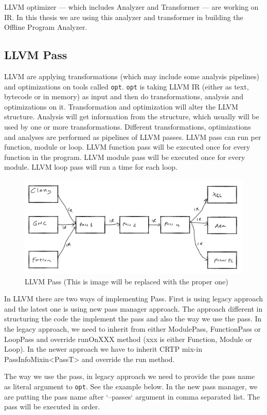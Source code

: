 LLVM optimizer — which includes Analyzer and Transformer — are working on IR. In this thesis we are using this analyzer and transformer in building the Offline Program Analyzer.

\subsection{LLVM Pass}

LLVM are applying transformations (which may include some analysis pipelines) and optimizations on tools called \texttt{opt}. \texttt{opt} is taking LLVM IR (either as text, bytecode or in memory) as input and then do transformations, analysis and optimizations on it. Transformation and optimization will alter the LLVM structure. Analysis will get information from the structure, which usually will be used by one or more transformations.  Different transformations, optimizations and analyses are performed as pipelines of LLVM passes. LLVM pass can run per function, module or loop. LLVM function pass will be executed once for every function in the program. LLVM module pass will be executed once for every module. LLVM loop pass will run a time for each loop.  \begin{figure}[htbp] \centerline{\includegraphics[scale=.25]{Figures/llvm.png}} \caption{LLVM Pass (This is image will be replaced with the proper one)} \label{fig:2-2} \end{figure} In LLVM there are two ways of implementing Pass. First is using legacy approach and the latest one is using new pass manager approach. The approach different in structuring the code the implement the pass and also the way we use the pass.  In the legacy approach, we need to inherit from either ModulePass, FunctionPass or LoopPass and override runOnXXX method (xxx is either Function, Module or Loop). In the newer approach we have to inherit CRTP mix-in PassInfoMixin<PassT> and override the run method.

The way we use the pass, in legacy approach we need to provide the pass name as literal argument to \texttt{opt}. See the example below. In the new pass manager, we are putting the pass name after `--passes` argument in comma separated list. The pass will be executed in order.


